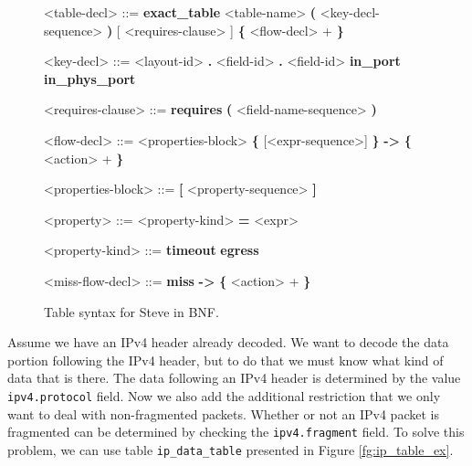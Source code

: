 \begin{figure}[ht]
\begin{mdframed}
\begin{grammar}
<table-decl> ::=
\textbf{exact\_table} <table-name> \textbf{(} <key-decl-sequence> \textbf{)} 
[ <requires-clause> ]
\textbf{\{} 
<flow-decl> + 
\textbf{\}}

<key-decl> ::=
<layout-id> \textbf{.} <field-id>
 \textbf{.} <field-id>
\alt \textbf{in\_port}
\alt \textbf{in\_phys\_port}

<requires-clause> ::=
\textbf{requires} \textbf{(} <field-name-sequence> \textbf{)}

<flow-decl> ::=
<properties-block>
\textbf{\{} [<expr-sequence>] \textbf{\}} \textbf{-\textgreater}
\textbf{\{} 
<action> +
\textbf{\}}

<properties-block> ::=
\textbf{[} <property-sequence> \textbf{]}

<property> ::=
<property-kind> \textbf{=} <expr>

<property-kind> ::=
\textbf{timeout}
\alt \textbf{egress}

<miss-flow-decl> ::=
\textbf{miss} \textbf{-\textgreater}
\textbf{\{} 
<action> +
\textbf{\}}
\end{grammar}
\end{mdframed}
\caption{Table syntax for Steve in BNF.}
\label{fg:table_syntax}
\end{figure}

Assume we have an IPv4 header already decoded. We want to decode the data portion following the IPv4 header, but to do that we must know what kind of data that is there. The data following an IPv4 header is determined by the value \texttt{ipv4.protocol} field. Now we also add the additional restriction that we only want to deal with non-fragmented packets. Whether or not an IPv4 packet is fragmented can be determined by checking the \texttt{ipv4.fragment} field. To solve this problem, we can use table \texttt{ip\_data\_table} presented in Figure \ref{fg:ip_table_ex}.

